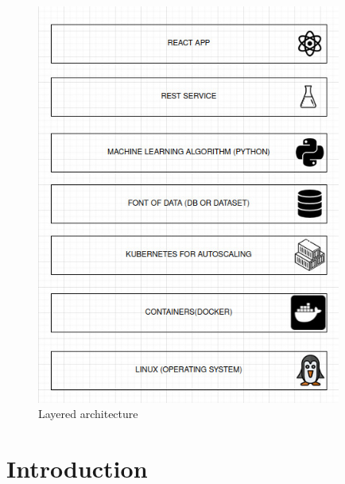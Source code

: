 \begin{figure}
    \centering
    \includegraphics[width=10cm]{assets/index.jpg}
    \caption{Layered architecture}
    \label{Arquitetura de camadas}
    \end{figure}
\section{Introduction}
